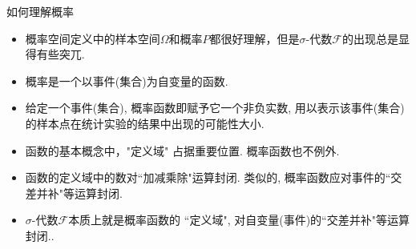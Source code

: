 \begin{frame}{如何理解概率}
\begin{itemize}[<+-|alert@+>]
	\item 概率空间定义中的样本空间$\Omega$和概率$P$都很好理解，但是$\sigma$-代数$\mathcal{F}$的出现总是显得有些突兀.
	\item 概率是一个以事件(集合)为自变量的函数.
	\item 给定一个事件(集合), 概率函数即赋予它一个非负实数, 用以表示该事件(集合)的样本点在统计实验的结果中出现的可能性大小.
	\item 函数的基本概念中，"定义域" 占据重要位置. 概率函数也不例外.
	\item 函数的定义域中的数对``加减乘除"运算封闭. 类似的, 概率函数应对事件的``交差并补"等运算封闭.
	\item $\sigma$-代数$\mathcal{F}$本质上就是概率函数的 ``定义域", 对自变量(事件)的``交差并补"等运算封闭..
\end{itemize}




\end{frame}






